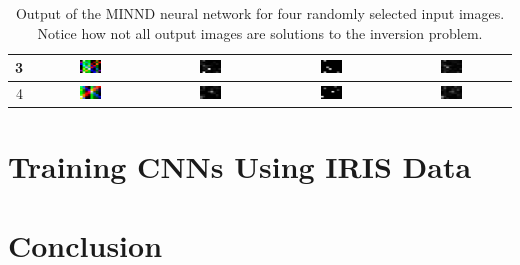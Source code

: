 \documentclass[twoside]{article}
\begin{document}
\begin{multicols}{2}
\begin{table}
\begin{tabular}{| r | c | c | c | c |}
3 & 
\includegraphics[width=0.2\textwidth]{images/8x8/3/in} &
\includegraphics[width=0.2\textwidth]{images/8x8/3/out} &
\includegraphics[width=0.2\textwidth]{images/8x8/3/truth} &
\includegraphics[width=0.2\textwidth]{images/8x8/3/dif} \\ \hline
4 & 
\includegraphics[width=0.2\textwidth]{images/8x8/4/in} &
\includegraphics[width=0.2\textwidth]{images/8x8/4/out} &
\includegraphics[width=0.2\textwidth]{images/8x8/4/truth} &
\includegraphics[width=0.2\textwidth]{images/8x8/4/dif} \\ \hline
\end{tabular}
\caption{Output of the MINND neural network for four randomly selected input images. Notice how not all output images are solutions to the inversion problem.}
\label{8x8im}
\end{table}

\section{Training CNNs Using IRIS Data}
\section{Conclusion}







\end{multicols}

	
	
\end{document}
